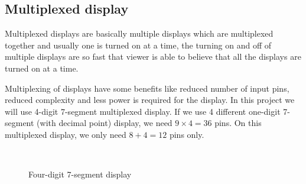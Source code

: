 \documentclass[a4paper,twoside]{report}
\begin{document}
\subsection{Multiplexed display}
Multiplexed displays are basically multiple displays which are multiplexed together and usually one is turned on at a time, the turning on and off of multiple displays are so fast that viewer is able to believe that all the displays are turned on at a time. \cite{multiplex_7seg}
 
Multiplexing of displays have some benefits like reduced number of input pins, reduced complexity and less power is required for the display. In this project we will use 4-digit 7-segment multiplexed display. If we use 4 different one-digit 7-segment (with decimal point) display, we need $9\times 4=36$ pins. On this multiplexed display, we only need $8 + 4=12$ pins only. 

\begin{figure}[H]
\centering
{}\\
\caption{Four-digit 7-segment display\protect\footnotemark}
\end{figure}
\end{document}
